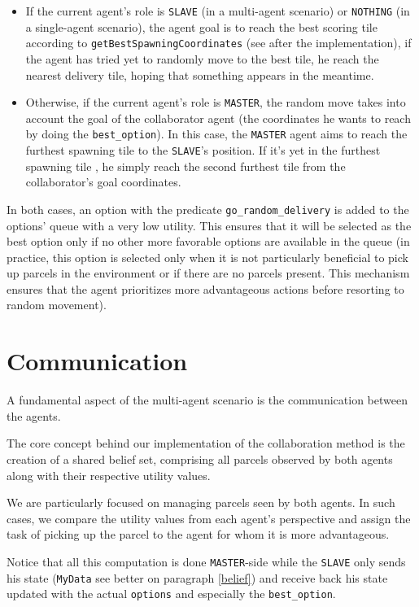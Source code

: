 \documentclass[10pt]{article}
\begin{document}
\begin{itemize}
\item If the current agent's role is \texttt{SLAVE} (in a multi-agent scenario) or \texttt{NOTHING} (in a single-agent scenario), the agent goal is to reach the best scoring tile according to \texttt{getBestSpawningCoordinates} (see after the implementation), if the agent has tried yet to randomly move to the best tile, he reach the nearest delivery tile, hoping that something appears in the meantime.
\item Otherwise, if the current agent's role is \texttt{MASTER}, the random move takes into account the goal of the collaborator agent (the coordinates he wants to reach by doing the \texttt{best\_option}). In this case, the \texttt{MASTER} agent aims to reach the furthest spawning tile to the \texttt{SLAVE}'s position. If it's yet in the furthest spawning tile , he simply reach the second furthest tile from the collaborator's goal coordinates.
\end{itemize}

In both cases, an option with the predicate \texttt{go\_random\_delivery} is added to the options' queue with a very low utility. This ensures that it will be selected as the best option only if no other more favorable options are available in the queue (in practice, this option is selected only when it is not particularly beneficial to pick up parcels in the environment or if there are no parcels present. This mechanism ensures that the agent prioritizes more advantageous actions before resorting to random movement).

\section{Communication}
A fundamental aspect of the multi-agent scenario is the communication between the agents.

The core concept behind our implementation of the collaboration method is the creation of a shared belief set, comprising all parcels observed by both agents along with their respective utility values.

We are particularly focused on managing parcels seen by both agents. In such cases, we compare the utility values from each agent's perspective and assign the task of picking up the parcel to the agent for whom it is more advantageous.

Notice that all this computation is done \texttt{MASTER}-side while the \texttt{SLAVE} only sends his state (\texttt{MyData} see better on paragraph \ref{belief}) and receive back his state updated with the actual \texttt{options} and especially the \texttt{best\_option}. 
\end{document}
